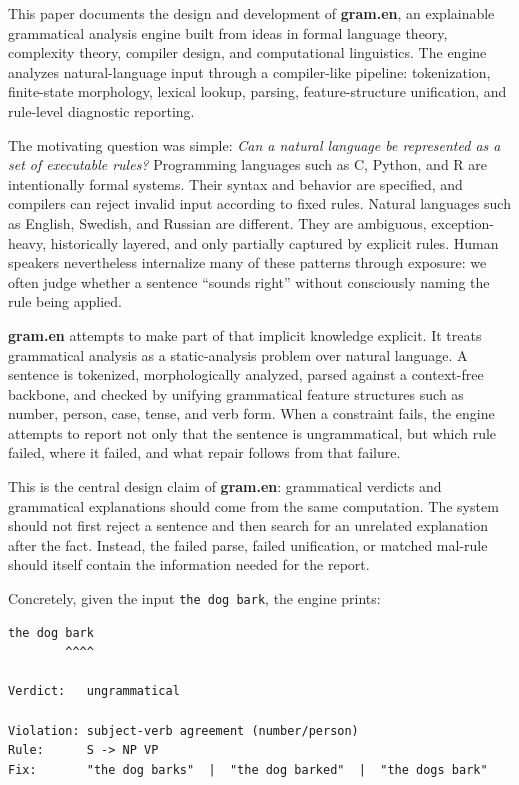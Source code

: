 \documentclass[11pt]{article}
\theoremstyle{definition}
\theoremstyle{plain}
\theoremstyle{remark}
\newcommand{\Gram}{\textbf{gram.en}}
\begin{document}
This paper documents the design and development of \Gram{}, an explainable grammatical
analysis engine built from ideas in formal language theory, complexity theory, compiler
design, and computational linguistics. The engine analyzes natural-language input through
a compiler-like pipeline: tokenization, finite-state morphology, lexical lookup, parsing,
feature-structure unification, and rule-level diagnostic reporting.

The motivating question was simple: \emph{Can a natural language be represented as a set of
executable rules?} Programming languages such as C, Python, and R are intentionally formal
systems. Their syntax and behavior are specified, and compilers
can reject invalid input according to fixed rules. Natural languages such as English,
Swedish, and Russian are different. They are ambiguous, exception-heavy, historically
layered, and only partially captured by explicit rules. Human speakers nevertheless
internalize many of these patterns through exposure: we often judge whether a sentence
``sounds right'' without consciously naming the rule being applied.

\Gram{} attempts to make part of that implicit knowledge explicit. It treats grammatical
analysis as a static-analysis problem over natural language. A sentence is tokenized,
morphologically analyzed, parsed against a context-free backbone, and checked by unifying
grammatical feature structures such as number, person, case, tense, and verb form. When a
constraint fails, the engine attempts to report not only that the sentence is ungrammatical,
but which rule failed, where it failed, and what repair follows from that failure.

This is the central design claim of \Gram{}: grammatical verdicts and
grammatical explanations should come from the same computation. The system should
not first reject a sentence and then search for an unrelated explanation after
the fact. Instead, the failed parse, failed unification, or matched mal-rule
should itself contain the information needed for the report.

Concretely, given the input \texttt{the dog bark}, the engine prints:

\begin{lstlisting}
the dog bark
        ^^^^

Verdict:   ungrammatical

Violation: subject-verb agreement (number/person)
Rule:      S -> NP VP
Fix:       "the dog barks"  |  "the dog barked"  |  "the dogs bark"
\end{lstlisting}
\end{document}
